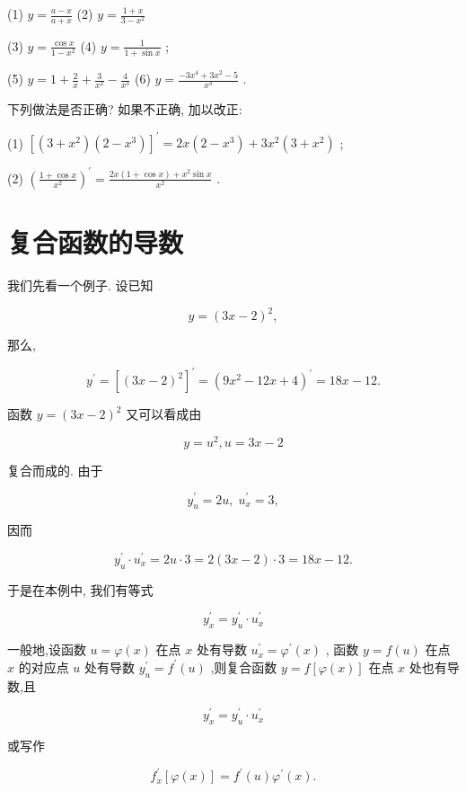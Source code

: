 \documentclass[lang=cn,newtx,12pt,scheme=chinese]{elegantbook}
\begin{document}
\begin{problemset}[练习]
(1) \(y = \frac{a - x}{a + x}\) (2) \(y = \frac{1 + x}{3 - {x}^{2}}\)

(3) \(y = \frac{\cos x}{1 - {x}^{2}}\) (4) \(y = \frac{1}{1 + \sin x}\) ;

(5) \(y = 1 + \frac{2}{x} + \frac{3}{{x}^{2}} - \frac{4}{{x}^{3}}\) (6) \(y = \frac{-3{x}^{4} + 3{x}^{2} - 5}{{x}^{3}}\) .

\item 下列做法是否正确? 如果不正确, 加以改正:

(1) \({\left\lbrack \left( 3 + {x}^{2}\right) \left( 2 - {x}^{3}\right) \right\rbrack }^{\prime } = {2x}\left( {2 - {x}^{3}}\right) + 3{x}^{2}\left( {3 + {x}^{2}}\right)\) ;

(2) \({\left( \frac{1 + \cos x}{{x}^{2}}\right) }^{\prime } = \frac{{2x}\left( {1 + \cos x}\right) + {x}^{2}\sin x}{{x}^{2}}\) .

\end{problemset}

\section{复合函数的导数}

我们先看一个例子. 设已知

\[
y = {\left( 3x - 2\right) }^{2},
\]

那么,

\[
{y}^{\prime } = {\left\lbrack {\left( 3x - 2\right) }^{2}\right\rbrack }^{\prime } = {\left( 9{x}^{2} - {12}x + 4\right) }^{\prime } = {18x} - {12}.
\]

函数 \(y = {\left( 3x - 2\right) }^{2}\) 又可以看成由

\[
y = {u}^{2},u = {3x} - 2
\]

复合而成的. 由于

\[
{y}_{u}^{\prime } = {2u},\;{u}_{x}^{\prime } = 3,
\]

因而

\[
{y}_{u}^{\prime } \cdot {u}_{x}^{\prime } = {2u} \cdot 3 = 2\left( {{3x} - 2}\right) \cdot 3 = {18x} - {12}.
\]

于是在本例中, 我们有等式

\[
{y}_{x}^{\prime } = {y}_{u}^{\prime } \cdot {u}_{x}^{\prime }
\]

\begin{proposition}[复合函数求导法则]

一般地,设函数 \(u = \varphi \left( x\right)\) 在点 \(x\) 处有导数 \({u}_{x}^{\prime } = {\varphi }^{\prime }\left( x\right)\) , 函数 \(y = f\left( u\right)\) 在点 \(x\) 的对应点 \(u\) 处有导数 \({y}_{u}^{\prime } = {f}^{\prime }\left( u\right)\) ,则复合函数 \(y = f\left\lbrack {\varphi \left( x\right) }\right\rbrack\) 在点 \(x\) 处也有导数,且

\[
{y}_{x}^{\prime } = {y}_{u}^{\prime } \cdot {u}_{x}^{\prime }
\]

或写作

\[
{f}_{x}^{\prime }\left\lbrack {\varphi \left( x\right) }\right\rbrack = {f}^{\prime }\left( u\right) {\varphi }^{\prime }\left( x\right) .
\]

\end{proposition}
\end{document}
